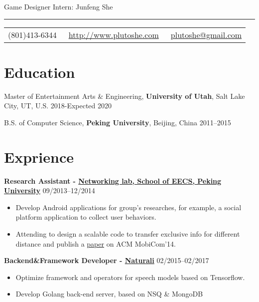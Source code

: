 \documentclass{article}
\begin{document}
	
	\color{text1} %
	
	\par{\centering
		{\sffamily\huge Game Designer Intern: Junfeng She
		}\\	
		{\color{headings} \par}
		{\color{white} \hrule} %
		
		\vspace{10pt}
		
		\colorbox{mygrey}{\textcolor{text1}{
				\begin{tabular}{c|c|c}
					\raisebox{-2pt}{\Phone} (801)413-6344 &
					\raisebox{-2pt}{\Envelope} ~\href{http://www.plutoshe.com}{http://www.plutoshe.com}	 &	 \raisebox{0pt}{\textbf{@}}
					~\href{mailto:plutoshe@gmail.com}{plutoshe@gmail.com}
				\end{tabular}
			}
		}
		\vspace{10pt}
		
		\section{Education}
		\vspace{5pt}
		Master of Entertainment Arts \& Engineering, \textbf{University of Utah}, Salt Lake City, UT, U.S. \hfill 2018-Expected 2020
		\vspace{5pt}
		
		B.S. of Computer Science, \textbf{Peking University}, Beijing, China \hfill 2011--2015
		\vspace{10pt}
		
		\section{Exprience}
		\textbf{Research Assistant - \href{http://net.pku.edu.cn/mobile/doku.php?id=eng:start}{Networking lab, School of EECS, Peking University}} \hfill 09/2013--12/2014
			\begin{itemize}
				\item Develop Android applications for group's researches, for example, a social platform application to collect user behaviors.
				\item Attending to design a scalable code to transfer exclusive info for different distance and publish a \href{https://www.eng.yale.edu/wenjun/papers/strata.pdf}{paper} on ACM MobiCom'14.
			\end{itemize}
		\textbf{Backend\&Framework Developer - \href{https://naturali.io}{Naturali}} \hfill 02/2015--02/2017
		\begin{itemize}
			\item Optimize framework and operators for speech models based on Tensorflow.
			\item Develop Golang back-end server, based on NSQ \& MongoDB
		\end{itemize}
		
}
\end{document}
